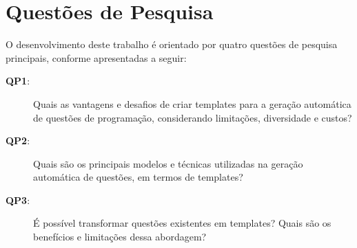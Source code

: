 \section{Questões de Pesquisa}

O desenvolvimento deste trabalho é orientado por quatro questões de pesquisa principais, conforme apresentadas a seguir:\\

\begin{description}
    \item[\textbf{QP1}:] Quais as vantagens e desafios de criar templates para a geração automática de questões de programação, considerando limitações, diversidade e custos?
    \item[\textbf{QP2}:] Quais são os principais modelos e técnicas utilizadas na geração automática de questões, em termos de templates?
    \item[\textbf{QP3}:] É possível transformar questões existentes em templates? Quais são os benefícios e limitações dessa abordagem?

\end{description}







